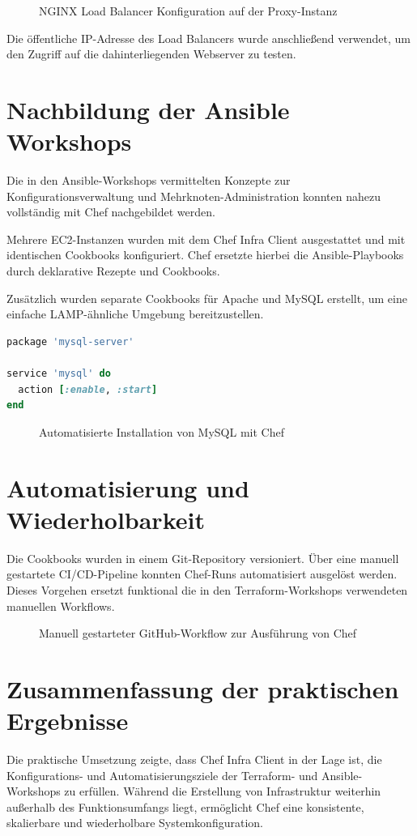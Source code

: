 \documentclass[BMR,Seminar,ngerman,IEEE]{twbook}
\newcommand{\placeholderfig}[2]{%
  \begin{figure}[htbp]
    \centering
    \fbox{\rule{0pt}{120pt}\rule{0.9\linewidth}{0pt}}%
    \caption{#1}%
    \label{fig:#2}%
  \end{figure}%
}
\begin{document}
\placeholderfig{NGINX Load Balancer Konfiguration auf der Proxy-Instanz}{nginx-lb}

Die öffentliche IP-Adresse des Load Balancers wurde anschließend verwendet, um den Zugriff
auf die dahinterliegenden Webserver zu testen.

\section{Nachbildung der Ansible Workshops}

Die in den Ansible-Workshops vermittelten Konzepte zur Konfigurationsverwaltung und
Mehrknoten-Administration konnten nahezu vollständig mit Chef nachgebildet werden.

Mehrere EC2-Instanzen wurden mit dem Chef Infra Client ausgestattet und mit identischen
Cookbooks konfiguriert.
Chef ersetzte hierbei die Ansible-Playbooks durch deklarative Rezepte und Cookbooks.

Zusätzlich wurden separate Cookbooks für Apache und MySQL erstellt, um eine einfache
LAMP-ähnliche Umgebung bereitzustellen.

\begin{lstlisting}[language=Ruby, caption={Chef-Rezept zur Installation von MySQL}]
package 'mysql-server'

service 'mysql' do
  action [:enable, :start]
end
\end{lstlisting}

\placeholderfig{Automatisierte Installation von MySQL mit Chef}{chef-mysql}

\section{Automatisierung und Wiederholbarkeit}

Die Cookbooks wurden in einem Git-Repository versioniert.
Über eine manuell gestartete CI/CD-Pipeline konnten Chef-Runs automatisiert ausgelöst werden.
Dieses Vorgehen ersetzt funktional die in den Terraform-Workshops verwendeten manuellen Workflows.

\placeholderfig{Manuell gestarteter GitHub-Workflow zur Ausführung von Chef}{github-actions}

\section{Zusammenfassung der praktischen Ergebnisse}

Die praktische Umsetzung zeigte, dass Chef Infra Client in der Lage ist,
die Konfigurations- und Automatisierungsziele der Terraform- und Ansible-Workshops zu erfüllen.
Während die Erstellung von Infrastruktur weiterhin außerhalb des Funktionsumfangs liegt,
ermöglicht Chef eine konsistente, skalierbare und wiederholbare Systemkonfiguration.
\end{document}
